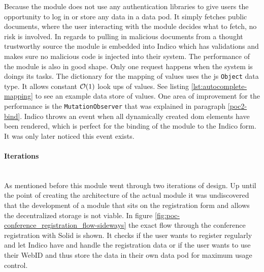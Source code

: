 Because the module does not use any authentication libraries to give users the opportunity to log in or store any data in a data pod. It simply fetches public documents, where the user interacting with the module decides what to fetch, no risk is involved. In regards to pulling in malicious documents from a thought trustworthy source the module is embedded into Indico which has validations and makes sure no malicious code is injected into their system.
The performance of the module is also in good shape. Only one request happens when the system is doings its tasks. The dictionary for the mapping of values uses the \gls{js} \texttt{Object} data type. It allows constant $\mathcal{O}(1)$ look ups of values. See listing \ref{lst:autocomplete-mapping} to see an example data store of values. One area of improvement for the performance is the \texttt{MutationObserver} that was explained in paragraph \ref{poc2-bind}. Indico throws an event when all dynamically created \gls{dom} elements have been rendered, which is perfect for the binding of the module to the Indico form. It was only later noticed this event exists.
\vspace{0.5cm}
\paragraph{Iterations}\mbox{}\\

As mentioned before this module went through two iterations of design. Up until the point of creating the architecture of the actual module it was undiscovered that the development of a module that sits on the registration form and allows the decentralized storage is not viable. In figure \ref{fig:poc-conference_registration_flow-sideways} the exact flow through the conference registration with Solid is shown. It checks if the user wants to register regularly and let Indico have and handle the registration data or if the user wants to use their WebID and thus store the data in their own data pod for maximum usage control.

